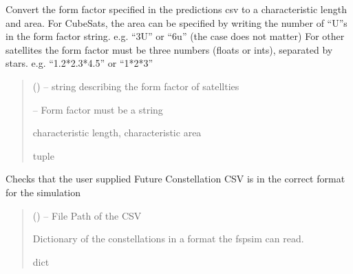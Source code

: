\documentclass[letterpaper,10pt,english]{sphinxmanual}
\begin{document}
\begin{fulllineitems}
\label{\detokenize{fspsim.utils:fspsim.utils.Formatting.calculate_form_factor}}
\pysigstartsignatures
{}
\pysigstopsignatures
\sphinxAtStartPar
Convert the form factor specified in the predictions csv to a characteristic length and area.
For CubeSats, the area can be specified by writing the number of “U”s in the form factor string. e.g. “3U” or “6u” (the case does not matter)
For other satellites the form factor must be three numbers (floats or ints), separated by stars. e.g. “1.2*2.3*4.5” or “1*2*3”
\begin{quote}\begin{description}
\sphinxAtStartPar
{} () – string describing the form factor of satellties

\sphinxAtStartPar
{} – Form factor must be a string

\sphinxAtStartPar
characteristic length, characteristic area

\sphinxAtStartPar
tuple

\end{description}\end{quote}

\end{fulllineitems}


\begin{fulllineitems}
\label{\detokenize{fspsim.utils:fspsim.utils.Formatting.future_constellations_csv_handler}}
\pysigstartsignatures
{}
\pysigstopsignatures
\sphinxAtStartPar
Checks that the user supplied Future Constellation CSV is in the correct format for the simulation
\begin{quote}\begin{description}
\sphinxAtStartPar
{} () – File Path of the CSV

\sphinxAtStartPar
Dictionary of the constellations in a format the fspsim can read.

\sphinxAtStartPar
dict

\end{description}\end{quote}

\end{fulllineitems}
\end{document}
